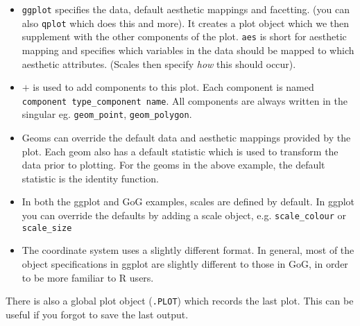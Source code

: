 \begin{itemize}
	\item {\tt ggplot} specifies the data, default aesthetic mappings and facetting. (you can also {\tt qplot} which does this and more).  It creates a plot object which we then supplement with the other components of the plot.  {\tt aes} is short for aesthetic mapping and specifies which variables in the data should be mapped to which aesthetic attributes.  (Scales then specify {\em how} this should occur).
	
	\item $+$ is used to add components to this plot.  Each component is named {\tt component type\_component name}.  All components are always written in the singular eg. {\tt geom\_point}, {\tt geom\_polygon}.
	
	\item Geoms can override the default data and aesthetic mappings provided by the plot.  Each geom also has a default statistic which is used to transform the data prior to plotting.  For the geoms in the above example, the default statistic is the identity function.  
		
	\item In both the ggplot and GoG examples, scales are defined by default.  In ggplot you can override the defaults by adding a scale object, e.g. {\tt scale\_colour} or {\tt scale\_size}
	
	\item The coordinate system uses a slightly different format.  In general, most of the object specifications in ggplot are slightly different to those in GoG, in order to be more familiar to R users.
\end{itemize}

There is also a global plot object ({\tt .PLOT}) which records the last plot.  This can be useful if you forgot to save the last output.

